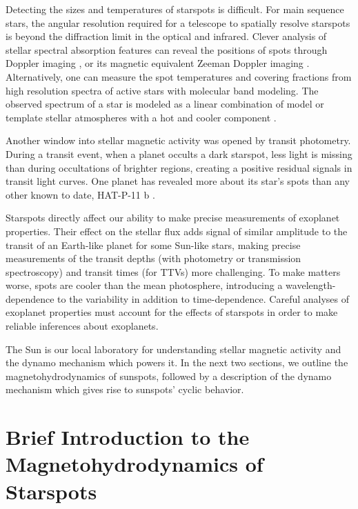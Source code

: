 Detecting the sizes and temperatures of starspots is difficult. For main sequence stars, the angular resolution required for a telescope to spatially resolve starspots is beyond the diffraction limit in the optical and infrared. Clever analysis of stellar spectral absorption features can reveal the positions of spots through Doppler imaging \citep{Vogt1983,Barnes2001,Strassmeier2002}, or its magnetic equivalent Zeeman Doppler imaging \citep{Donati2003,Morin2008,Morin2010,Morin2011,Morin2013}. Alternatively, one can measure the spot temperatures and covering fractions from high resolution spectra of active stars with molecular band modeling. The observed spectrum of a star is modeled as a linear combination of model or template stellar atmospheres with a hot and cooler component \citep{Neff1995,oneal1996,oneal1998,ONeal2004}. 

Another window into stellar magnetic activity was opened by \kepler transit photometry. During a transit event, when a planet occults a dark starspot, less light is missing than during occultations of brighter regions, creating a positive residual signals in transit light curves. One planet has revealed more about its star's spots than any other known to date, HAT-P-11 b \citep{Bakos2010,Winn2010,Deming2011,Sanchis-Ojeda2011,Hirano2011}. 

Starspots directly affect our ability to make precise measurements of exoplanet properties. Their effect on the stellar flux adds signal of similar amplitude to the transit of an Earth-like planet for some Sun-like stars, making precise measurements of the transit depths (with photometry or transmission spectroscopy) and transit times (for TTVs) more challenging. To make matters worse, spots are cooler than the mean photosphere, introducing a wavelength-dependence to the variability in addition to time-dependence. Careful analyses of exoplanet properties must account for the effects of starspots in order to make reliable inferences about exoplanets. 

The Sun is our local laboratory for understanding stellar magnetic activity and the dynamo mechanism which powers it. In the next two sections, we outline the magnetohydrodynamics of sunspots, followed by a description of the dynamo mechanism which gives rise to sunspots' cyclic behavior.  

\section{Brief Introduction to the Magnetohydrodynamics of Starspots}

